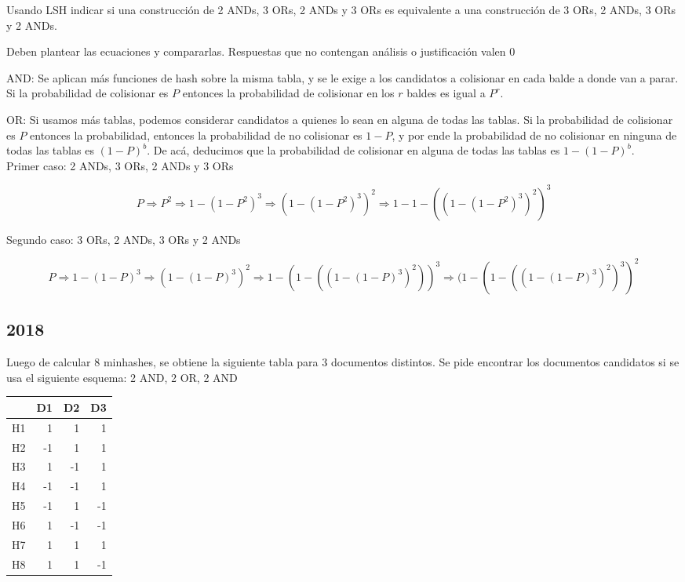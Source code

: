 \documentclass[a4paper]{article}
\newenvironment{enunciado}[3]{%
    \vspace{\baselineskip}
    \tcolorbox[beamer,%
    noparskip,breakable,
    colback=LightGreen,colframe=DarkGreen,%
    colbacklower=LimeGreen!75!LightGreen,%
    title=\small Enunciado: Año #1\, Cuatrimestre #2\, Oportunidad #3]}%
    {\endtcolorbox}
\newenvironment{criterio}[3]{%
    \tcolorbox[beamer,%
    noparskip,breakable,
    colback=LightCoral,colframe=DarkRed,%
    colbacklower=Tomato!75!LightCoral,%
    title=\small Criterio de Corrección: Año #1\, Cuatrimestre #2\, Oportunidad #3]}%
    {\endtcolorbox}
\begin{document}
    \begin{enunciado}{2017}{2}{2}
        Usando LSH indicar si una construcción de 2 ANDs, 3 ORs, 2 ANDs y 3 ORs es equivalente a una construcción de 3 ORs, 2 ANDs, 3 ORs y 2 ANDs. 
    \end{enunciado}

    \begin{criterio}{2017}{2}{2}
        Deben plantear las ecuaciones y compararlas. Respuestas que no contengan análisis o justificación valen 0
    \end{criterio}

    AND: Se aplican más funciones de hash sobre la misma tabla, y se le exige a los candidatos a colisionar en cada balde a donde van a parar. Si la probabilidad de colisionar es $P$ entonces la probabilidad de colisionar en los $r$ baldes es igual a $P^r$.
    
    OR: Si usamos más tablas, podemos considerar candidatos a quienes lo sean en alguna de todas las tablas.  Si la probabilidad de colisionar es $P$ entonces la probabilidad, entonces la probabilidad de no colisionar es $1-P$, y por ende la probabilidad de no colisionar en ninguna de todas las tablas es $(1-P)^b$. De acá, deducimos que la probabilidad de colisionar en alguna de todas las tablas es $1-(1-P)^b$. \\

    Primer caso: 2 ANDs, 3 ORs, 2 ANDs y 3 ORs

    $$P \Rightarrow P^2 \Rightarrow 1-(1-P^2)^3 \Rightarrow (1-(1-P^2)^3)^2 \Rightarrow 1-1-((1-(1-P^2)^3)^2)^3$$

    Segundo caso: 3 ORs, 2 ANDs, 3 ORs y 2 ANDs
    
    $$P \Rightarrow 1-(1-P)^3 \Rightarrow (1-(1-P)^3)^2 \Rightarrow 1-(1-((1-(1-P)^3)^2))^3 \Rightarrow (1-(1-((1-(1-P)^3)^2)^3)^2$$

    \subsection{2018}

    \begin{enunciado}{2018}{1}{1}
	Luego  de  calcular  8  minhashes,  se  obtiene  la  siguiente  tabla  para  3 documentos distintos. Se pide encontrar los documentos candidatos si se usa el siguiente esquema: 2 AND, 2 OR, 2 AND
	\end{enunciado}
	\begin{table}[H]
		\begin{tabular}{|l|r|r|r|}
            \hline
            & D1 & D2 & D3 \\
           \hline
		H1 & 1  & 1  & 1  \\
		H2 & -1 & 1  & 1  \\
		H3 & 1  & -1 & 1  \\
		H4 & -1 & -1 & 1  \\
		H5 & -1 & 1  & -1 \\
		H6 & 1  & -1 & -1 \\
		H7 & 1  & 1  & 1  \\
        H8 & 1  & 1  & -1 \\
        \hline
		\end{tabular}
	\end{table}
\end{document}
